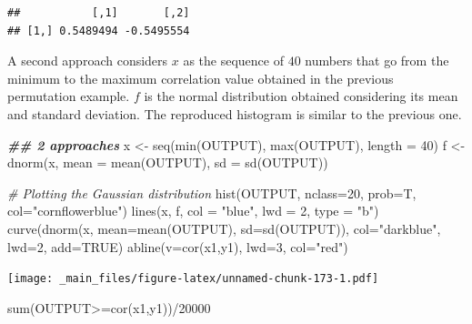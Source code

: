 \documentclass[
  notitlepage,
  onecolumn,
  openany]{book}
\newenvironment{Shaded}{\begin{snugshade}}{\end{snugshade}}
\newcommand{\AttributeTok}[1]{\textcolor[rgb]{0.77,0.63,0.00}{#1}}
\newcommand{\CommentTok}[1]{\textcolor[rgb]{0.56,0.35,0.01}{\textit{#1}}}
\newcommand{\ConstantTok}[1]{\textcolor[rgb]{0.00,0.00,0.00}{#1}}
\newcommand{\DecValTok}[1]{\textcolor[rgb]{0.00,0.00,0.81}{#1}}
\newcommand{\DocumentationTok}[1]{\textcolor[rgb]{0.56,0.35,0.01}{\textbf{\textit{#1}}}}
\newcommand{\FunctionTok}[1]{\textcolor[rgb]{0.00,0.00,0.00}{#1}}
\newcommand{\NormalTok}[1]{#1}
\newcommand{\OtherTok}[1]{\textcolor[rgb]{0.56,0.35,0.01}{#1}}
\newcommand{\SpecialCharTok}[1]{\textcolor[rgb]{0.00,0.00,0.00}{#1}}
\newcommand{\StringTok}[1]{\textcolor[rgb]{0.31,0.60,0.02}{#1}}
\begin{document}
\begin{verbatim}
##           [,1]       [,2]
## [1,] 0.5489494 -0.5495554
\end{verbatim}

A second approach considers \(x\) as the sequence of \(40\) numbers that go from the minimum to the maximum correlation value obtained in the previous permutation example. \(f\) is the normal distribution obtained considering its mean and standard deviation. The reproduced histogram is similar to the previous one.

\begin{Shaded}
\begin{Highlighting}[]
\DocumentationTok{\#\# 2 approaches}
\NormalTok{x }\OtherTok{\textless{}{-}} \FunctionTok{seq}\NormalTok{(}\FunctionTok{min}\NormalTok{(OUTPUT), }\FunctionTok{max}\NormalTok{(OUTPUT), }\AttributeTok{length =} \DecValTok{40}\NormalTok{)}
\NormalTok{f }\OtherTok{\textless{}{-}} \FunctionTok{dnorm}\NormalTok{(x, }\AttributeTok{mean =} \FunctionTok{mean}\NormalTok{(OUTPUT), }\AttributeTok{sd =} \FunctionTok{sd}\NormalTok{(OUTPUT))}

\CommentTok{\# Plotting the Gaussian distribution}
\FunctionTok{hist}\NormalTok{(OUTPUT, }\AttributeTok{nclass=}\DecValTok{20}\NormalTok{, }\AttributeTok{prob=}\NormalTok{T, }\AttributeTok{col=}\StringTok{"cornflowerblue"}\NormalTok{)}
\FunctionTok{lines}\NormalTok{(x, f, }\AttributeTok{col =} \StringTok{"blue"}\NormalTok{, }\AttributeTok{lwd =} \DecValTok{2}\NormalTok{, }\AttributeTok{type =} \StringTok{"b"}\NormalTok{)}
\FunctionTok{curve}\NormalTok{(}\FunctionTok{dnorm}\NormalTok{(x, }\AttributeTok{mean=}\FunctionTok{mean}\NormalTok{(OUTPUT), }\AttributeTok{sd=}\FunctionTok{sd}\NormalTok{(OUTPUT)), }
      \AttributeTok{col=}\StringTok{"darkblue"}\NormalTok{, }\AttributeTok{lwd=}\DecValTok{2}\NormalTok{, }\AttributeTok{add=}\ConstantTok{TRUE}\NormalTok{)}
\FunctionTok{abline}\NormalTok{(}\AttributeTok{v=}\FunctionTok{cor}\NormalTok{(x1,y1), }\AttributeTok{lwd=}\DecValTok{3}\NormalTok{, }\AttributeTok{col=}\StringTok{"red"}\NormalTok{)}
\end{Highlighting}
\end{Shaded}

\texttt{[image: \_main\_files/figure-latex/unnamed-chunk-173-1.pdf]}

\begin{Shaded}
\begin{Highlighting}[]
\FunctionTok{sum}\NormalTok{(OUTPUT}\SpecialCharTok{\textgreater{}=}\FunctionTok{cor}\NormalTok{(x1,y1))}\SpecialCharTok{/}\DecValTok{20000}
\end{Highlighting}
\end{Shaded}
\end{document}
